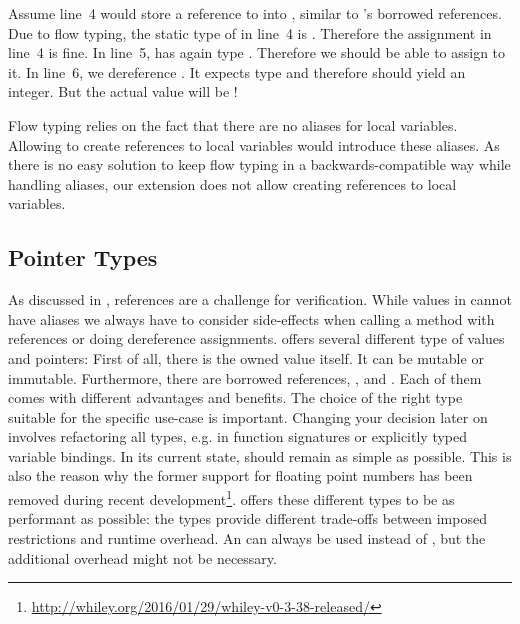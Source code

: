 Assume line~4 would store a reference to  into , similar to \rust's borrowed references.
Due to flow typing, the static type of  in line~4 is .
Therefore the assignment in line~4 is fine.
In line~5,  has again type .
Therefore we should be able to assign  to it.
In line~6, we dereference .
It expects type  and therefore should yield an integer.
But the actual value will be !

Flow typing relies on the fact that there are no aliases for local variables.
Allowing to create references to local variables would introduce these aliases.
As there is no easy solution to keep flow typing in a backwards-compatible way while handling aliases, our extension does not allow creating references to local variables.


\subsection{Pointer Types}
As discussed in , references are a challenge for verification.
While values in \whiley cannot have aliases we always have to consider side-effects when calling a method with references or doing dereference assignments.
\rust offers several different type of values and pointers:
First of all, there is the owned value itself.
It can be mutable or immutable.
Furthermore, there are borrowed references, ,  and .
Each of them comes with different advantages and benefits.
The choice of the right type suitable for the specific use-case is important.
Changing your decision later on involves refactoring all types, e.g. in function signatures or explicitly typed variable bindings.
In its current state, \whiley should remain as simple as possible.
This is also the reason why the former support for floating point numbers has been removed during recent development\footnote{\url{http://whiley.org/2016/01/29/whiley-v0-3-38-released/}}.
\rust offers these different types to be as performant as possible:
the types provide different trade-offs between imposed restrictions and runtime overhead.
An  can always be used instead of , but the additional overhead might not be necessary.

